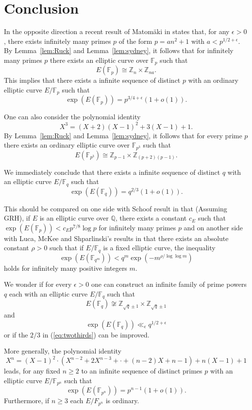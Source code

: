 \documentclass{amsart}
\def\Z{{\mathbb Z}}
\def\F{{\mathbb F}}
\begin{document}
\section{Conclusion}

In the opposite direction a recent result of Matom\"aki in \cite{kaisa} states that, for any $\epsilon>0$, 
there exists infinitely many primes $p$ of the form $p=an^2+1$ with $a<p^{1/2+\epsilon}$.
By Lemma~\ref{lem:Ruck} and Lemma~\ref{lem:sydney}, it follows that for infinitely many primes $p$ there exists an
elliptic curve over $\F_{p}$ such that
$$E(\F_{p})\cong \Z_{n}\times\Z_{na}.$$
This implies that there exists a infinite sequence of distinct $p$ with an ordinary elliptic curve $E/\F_p$ such that
$$\exp(E(\F_p))=p^{3/4+\epsilon}(1+o(1)).$$

One can also consider the polynomial
identity
$$X^3=(X+2)(X-1)^2+3(X-1)+1.$$
By Lemma~\ref{lem:Ruck} and Lemma~\ref{lem:sydney}, it follows that for every prime $p$ there exists an ordinary
elliptic curve over $\F_{p^3}$ such that
$$E(\F_{p^3})\cong \Z_{p-1}\times\Z_{(p+2)(p-1)}.$$

We immediately conclude that there exists a infinite sequence of distinct
$q$ with an elliptic curve $E/\F_q$ such that
\begin{equation}\label{eq:twothirds}
\exp(E(\F_q))=q^{2/3}(1+o(1)).\end{equation}

This should be compared on one side with Schoof result in \cite{schoof} that (Assuming 
GRH), if $E$ is an elliptic curve over $\mathbb Q$, there exists a constant $c_E$
such that $\exp(E(\F_p))<c_Ep^{7/8}\log p$ for infinitely many primes $p$ and on another side
with Luca, McKee and Shparlinski's results in \cite{lms} that there exists an absolute
constant $\rho>0$ such that if $E/\F_q$ is a fixed
elliptic curve, the inequality
$$\exp(E(\F_{q^m}))< q^m\exp\left(-m^{\rho/\log\log m}\right)$$
holds for infinitely many positive integers $m$.  

We wonder if for every $\epsilon>0$ one can construct an infinite family of
prime powers $q$ each with an elliptic curve $E/\F_q$ such that
$$E(\F_q)\not\cong\Z_{\sqrt{q}\pm1}\times\Z_{\sqrt{q}\pm1}$$
and
$$\exp(E(\F_q))\ll_\epsilon q^{1/2+\epsilon}$$
or if the $2/3$ in (\ref{eq:twothirds}) can be improved.

More generally, the polynomial identity
$$X^n=(X-1)^2\cdot\left(X^{n-2}+2X^{n-3}+\cdot+(n-2)X+n-1\right)+n(X-1)+1$$
leads, for any fixed $n\ge2$ to an infinite sequence  of distinct
primes $p$ with an elliptic curve $E/\F_{p^n}$ such that
$$
\exp(E(\F_{p^n}))=p^{n-1}(1+o(1)).
$$
Furthermore, if $n\ge3$ each $E/F_{p^n}$ is ordinary.
\bigskip
\end{document}
